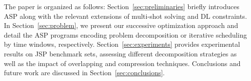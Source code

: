 \documentclass{tlp} %
\begin{document}
The paper is organized as follows:
Section~\ref{sec:preliminaries} briefly introduces ASP along with the relevant
extensions of multi-shot solving and DL constraints.
In Section~\ref{sec:problem}, we present our successive optimization approach
and detail the ASP programs encoding problem decomposition or iterative scheduling by time windows, respectively.
Section~\ref{sec:experiments} provides experimental results on JSP benchmark sets, assessing different decomposition strategies as well as the impact of overlapping and compression techniques.
Conclusions and future work are discussed in Section~\ref{sec:conclusions}.  


\end{document}
